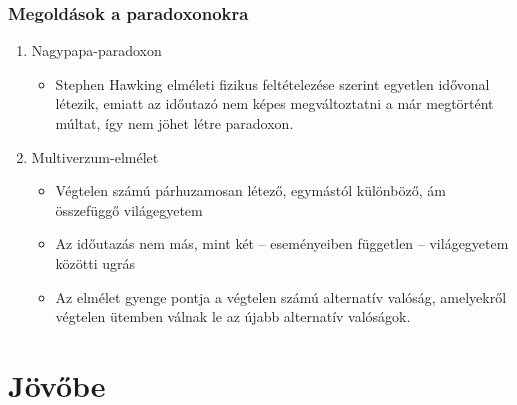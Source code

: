 \documentclass{beamer}
\begin{document}
\begin{frame}
\frametitle{Megoldások a paradoxonokra}
\begin{enumerate}
\item Nagypapa-paradoxon
\begin{itemize}
\item Stephen Hawking elméleti fizikus feltételezése szerint egyetlen idővonal létezik, emiatt az időutazó nem képes megváltoztatni a már megtörtént múltat, így nem jöhet létre paradoxon.
\end{itemize} \pause
\item Multiverzum-elmélet
\begin{itemize}
\item Végtelen számú párhuzamosan létező, egymástól különböző, ám összefüggő világegyetem
\item Az időutazás nem más, mint két – eseményeiben független – világegyetem közötti ugrás
\item Az elmélet gyenge pontja a végtelen számú alternatív valóság, amelyekről végtelen ütemben válnak le az újabb alternatív valóságok.
\end{itemize}
\end{enumerate}
\end{frame}

\section*{Jövőbe}
\begin{frame}
\transdissolve
\sectionpage
\end{frame}
\end{document}
